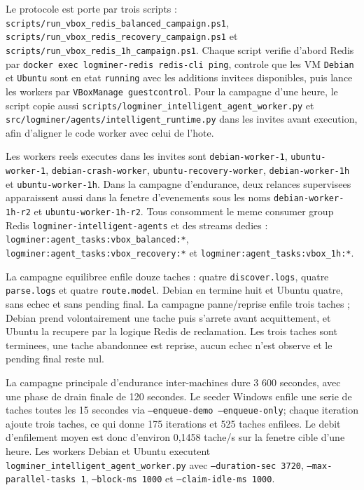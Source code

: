 Le protocole est porte par trois scripts : \texttt{scripts/run\_vbox\_redis\_balanced\_campaign.ps1}, \texttt{scripts/run\_vbox\_redis\_recovery\_campaign.ps1} et \texttt{scripts/run\_vbox\_redis\_1h\_campaign.ps1}. Chaque script verifie d'abord Redis par \texttt{docker exec logminer-redis redis-cli ping}, controle que les VM \texttt{Debian} et \texttt{Ubuntu} sont en etat \texttt{running} avec les additions invitees disponibles, puis lance les workers par \texttt{VBoxManage guestcontrol}. Pour la campagne d'une heure, le script copie aussi \texttt{scripts/logminer\_intelligent\_agent\_worker.py} et \texttt{src/logminer/agents/intelligent\_runtime.py} dans les invites avant execution, afin d'aligner le code worker avec celui de l'hote.

Les workers reels executes dans les invites sont \texttt{debian-worker-1}, \texttt{ubuntu-worker-1}, \texttt{debian-crash-worker}, \texttt{ubuntu-recovery-worker}, \texttt{debian-worker-1h} et \texttt{ubuntu-worker-1h}. Dans la campagne d'endurance, deux relances supervisees apparaissent aussi dans la fenetre d'evenements sous les noms \texttt{debian-worker-1h-r2} et \texttt{ubuntu-worker-1h-r2}. Tous consomment le meme consumer group Redis \texttt{logminer-intelligent-agents} et des streams dedies : \texttt{logminer:agent\_tasks:vbox\_balanced:*}, \texttt{logminer:agent\_tasks:vbox\_recovery:*} et \texttt{logminer:agent\_tasks:vbox\_1h:*}.

La campagne equilibree enfile douze taches : quatre \texttt{discover.logs}, quatre \texttt{parse.logs} et quatre \texttt{route.model}. Debian en termine huit et Ubuntu quatre, sans echec et sans pending final. La campagne panne/reprise enfile trois taches ; Debian prend volontairement une tache puis s'arrete avant acquittement, et Ubuntu la recupere par la logique Redis de reclamation. Les trois taches sont terminees, une tache abandonnee est reprise, aucun echec n'est observe et le pending final reste nul.

La campagne principale d'endurance inter-machines dure 3 600 secondes, avec une phase de drain finale de 120 secondes. Le seeder Windows enfile une serie de taches toutes les 15 secondes via \texttt{--enqueue-demo --enqueue-only}; chaque iteration ajoute trois taches, ce qui donne 175 iterations et 525 taches enfilees. Le debit d'enfilement moyen est donc d'environ 0,1458 tache/s sur la fenetre cible d'une heure. Les workers Debian et Ubuntu executent \texttt{logminer\_intelligent\_agent\_worker.py} avec \texttt{--duration-sec 3720}, \texttt{--max-parallel-tasks 1}, \texttt{--block-ms 1000} et \texttt{--claim-idle-ms 1000}.

